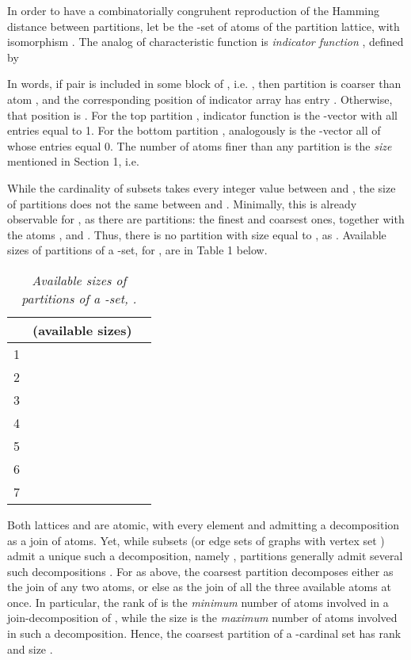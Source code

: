 \documentclass[a4paper,10pt]{article}
\begin{document}
In order to have a combinatorially congruhent reproduction of the Hamming distance between partitions, let  be the -set of atoms
of the partition lattice, with isomorphism . The analog of characteristic function  is \textit{indicator function}
, defined by
  
In words, if pair  is included in some block  of , i.e. , then partition  is coarser than atom , and the corresponding position
 of indicator array  has entry . Otherwise, that position is . For the top partition , indicator function  is the
-vector with all entries equal to 1. For the bottom partition , analogously  is the -vector all of whose
entries equal 0. The number  of atoms finer than any partition  is \cite{Rossi2011} the \textit{size} 
mentioned in Section 1, i.e.

While the cardinality  of subsets takes every integer value between  and , the size  of partitions
does not the same between  and . Minimally, this is already observable for , as there are  partitions: the finest
 and coarsest  ones, together with the  atoms ,  and .
Thus, there is no partition with size equal to , as . Available sizes of partitions of a -set, for
, are in Table 1 below.
\begin{table}[htbp]
\caption{\textsl{Available sizes of partitions of a -set, .}}
\label{tab: available sizes}
\begin{center}
\begin{tabular}{|c|c|c|}
\hline
 &  (available sizes)\\
\hline
1& \\
\hline
2 & \\
\hline
3 & \\
\hline
4 & \\
\hline
5 & \\
\hline
6 & \\
\hline
7 & \\
\hline
\end{tabular}
\end{center}
\end{table}

Both lattices  and  are atomic, with every element  and  admitting a decomposition as a join of atoms. Yet, while subsets
 (or edge sets of graphs with vertex set ) admit a unique such a decomposition, namely , partitions generally admit several such
decompositions . For  as above, the coarsest partition  decomposes either as the join of any two atoms, or else as the join of all
the three available atoms at once. In particular, the rank  of  is the \textit{minimum} number of atoms involved in a join-decomposition of , while the size  is
the \textit{maximum} number of atoms involved in such a decomposition. Hence, the coarsest partition  of a -cardinal set has rank  and size
. 
\end{document}

